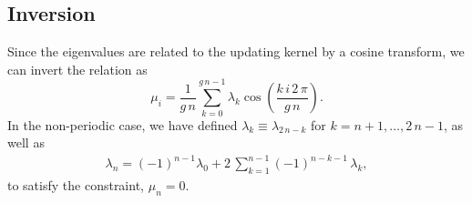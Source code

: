\documentclass[reprint, superscriptaddress, floatfix]{revtex4-1}
\begin{document}
\subsection{\label{sec:invert_wband}
Inversion}

Since the eigenvalues are related to the updating kernel
by a cosine transform,
we can invert the relation as
%
\begin{equation}
  \mu_i
  =
  \frac { 1 } { g \, n }
  \sum_{ k = 0 }^{ g \, n - 1 }
  \lambda_k
  \cos \left(
       \frac{ k \, i \, 2 \, \pi }
            {      g \, n        }
  \right)
  .
\label{eq:mu_from_lambda}
\end{equation}
%
In the non-periodic case,
we have defined
$\lambda_k \equiv \lambda_{2 \, n - k}$
for $k = n + 1, \dots, 2 \, n - 1$,
as well as
%
\begin{align}
  \lambda_n
  =
  (-1)^{ n - 1 }
  \lambda_0
  +
  2 \, \sum_{ k = 1 }^{ n - 1 }
      (-1)^{n - k - 1} \, \lambda_k
  ,
\label{eq:lambdan}
\end{align}
to satisfy the constraint, $\mu_n = 0$.
%
\end{document}
